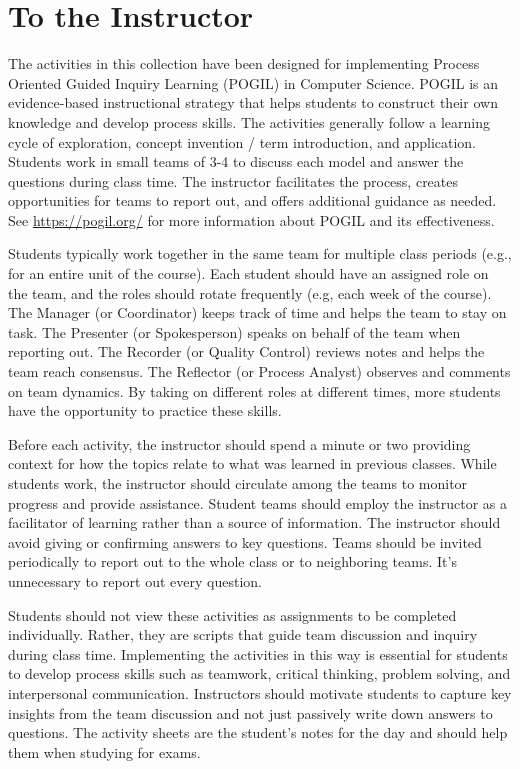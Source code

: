 \chapter*{To the Instructor}
\thispagestyle{empty}

The activities in this collection have been designed for implementing Process Oriented Guided Inquiry Learning (POGIL) in Computer Science. POGIL is an evidence-based instructional strategy that helps students to construct their own knowledge and develop process skills. The activities generally follow a learning cycle of exploration, concept invention / term introduction, and application. Students work in small teams of 3-4 to discuss each model and answer the questions during class time. The instructor facilitates the process, creates opportunities for teams to report out, and offers additional guidance as needed. See \url{https://pogil.org/} for more information about POGIL and its effectiveness.

\bigskip

Students typically work together in the same team for multiple class periods (e.g., for an entire unit of the course). Each student should have an assigned role on the team, and the roles should rotate frequently (e.g, each week of the course). The Manager (or Coordinator) keeps track of time and helps the team to stay on task. The Presenter (or Spokesperson) speaks on behalf of the team when reporting out. The Recorder (or Quality Control) reviews notes and helps the team reach consensus. The Reflector (or Process Analyst) observes and comments on team dynamics. By taking on different roles at different times, more students have the opportunity to practice these skills.

\bigskip

Before each activity, the instructor should spend a minute or two providing context for how the topics relate to what was learned in previous classes. While students work, the instructor should circulate among the teams to monitor progress and provide assistance. Student teams should employ the instructor as a facilitator of learning rather than a source of information. The instructor should avoid giving or confirming answers to key questions. Teams should be invited periodically to report out to the whole class or to neighboring teams. It's unnecessary to report out every question.

\bigskip

Students should not view these activities as assignments to be completed individually. Rather, they are scripts that guide team discussion and inquiry during class time. Implementing the activities in this way is essential for students to develop process skills such as teamwork, critical thinking, problem solving, and interpersonal communication. Instructors should motivate students to capture key insights from the team discussion and not just passively write down answers to questions. The activity sheets are the student's notes for the day and should help them when studying for exams.

